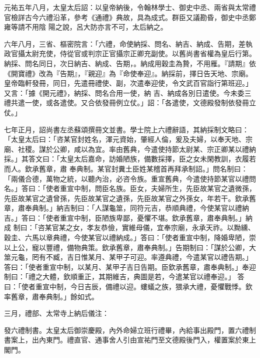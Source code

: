 \begin{pinyinscope}
 元祐五年八月，太皇太后詔：以皇帝納後，令翰林學士、御史中丞、兩省與太常禮官檢詳古今六禮沿革，參考《通禮》典故，具為成式。群臣又議勘昏，御史中丞鄭雍等請不用陰
 陽之說，呂大防亦言不可，太后納之。



 六年八月，三省、樞密院言：「六禮，命使納採、問名、納吉、納成、告期，差執政官攝太尉充使，侍從官或判宗正官攝宗正卿充副使。以舊尚書省權為皇后行第。納採、問名同日，次日納吉、納成、告期，。納成用穀圭為贄，不用雁。『請期』依《開寶禮》改為『告期』，『親迎』為『命使奉迎』。納採前，擇日告天地、宗廟。皇帝臨軒發冊，同日，先遣冊禮使、副，次遣奉迎使，令文武百官詣行第班迎。」又言：「據《開元禮》，納採、問名合用一使，納
 吉、納成各別日遣使。今未委三禮共遣一使，或各遣使。又合依發冊例立仗。」詔：「各遣使，文德殿發制依發冊立仗。」



 七年正月，詔尚書左丞蘇頌撰冊文並書。學士院上六禮辭語，其納採制文略曰：「太皇太后曰：「咨某官封姓名，渾元資始，肇經人倫，爰及夫婦，以奉天地、宗廟、社稷。謀於公卿，咸以為宜。率由舊典，今遣使持節太尉某、宗正卿某以禮納採。」其答文曰：「太皇太后嘉命，訪婚陋族，備數採擇，臣之女未閑教訓，衣履若而人。欽承舊章，肅
 奉典制。某官封糞土臣姓某稽首再拜承制詔。」問名制曰：「兩儀合德，萬物之統，以聽內治，必咨令族。重宣舊典，今遣使持節某官以禮問名。」答曰：「使者重宣中制，問臣名族。臣女，夫婦所生，先臣故某官之遺微孫，先臣故某官之遺曾孫，先臣故某官之遺孫，先臣故某官之外孫女，年若干。欽承舊章，肅奉典制。」納吉制曰：「人謀龜筮，同符元吉，恭順典禮，今使某官以禮納吉。」答曰：「使者重宣中制，臣陋族卑鄙，憂懼不堪。欽承舊章，肅奉典制。」納成
 制曰：「咨某官某之女，孝友恭儉，實維母儀，宜奉宗廟，永承天祚。以黝纁、穀圭、六馬以章典禮，今使某官以禮納成。」答曰：「使者重宣中制，降婚卑陋，崇以上公，寵以豐禮，備物典策。欽承舊章，肅奉典制。」告期制曰：「謀於公卿，大筮元龜，罔有不臧，吉日惟某月、某甲子可迎。率遵典禮，今遣某官以禮告期。」答曰：「使者重宣中制，以某月、某甲子吉日告期。臣欽承舊章，肅奉典制。」奉迎制曰：「禮之大體，欽順重正，其期維吉，典圖是若，今遣某官以禮奉迎。」
 答曰：「使者重宣中制，今日吉辰，備禮以迎。螻蟻之族，猥承大禮，憂懼戰悸。欽率舊章，肅奉典制。」餘如式。



 三月，禮部、太常寺上納后儀注：



 發六禮制書。太皇太后御崇慶殿，內外命婦立班行禮畢，內給事出殿門，置六禮制書案上，出內東門。禮直官、通事舍人引由宣祐門至文德殿後門入，權置案於東上閣門。




\end{pinyinscope}
